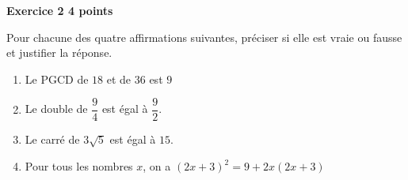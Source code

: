 \textbf{Exercice 2 \hfill 4 points}

\medskip

Pour chacune des quatre affirmations suivantes, préciser si elle est vraie ou fausse 
et justifier la réponse.

\medskip
 
\begin{enumerate}
\item Le PGCD de $18$ et de $36$ est $9$ 
\item Le double de $\dfrac{9}{4}$ est égal à $\dfrac{9}{2}$. 
\item Le carré de $3\sqrt{5}$ est égal à $15$. 
\item Pour tous les nombres $x$, on a $(2x + 3)^2 = 9 + 2x(2x + 3)$ 
\end{enumerate}

\bigskip

